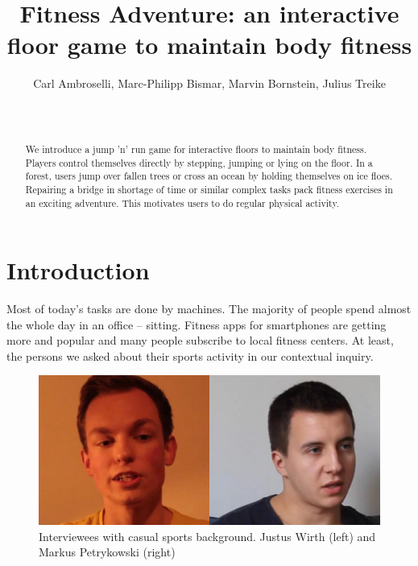 \documentclass{sigchi}
\begin{document}
  \title{Fitness Adventure: an interactive floor game to maintain body fitness}

  \author{
    \alignauthor Carl Ambroselli, Marc-Philipp Bismar, Marvin Bornstein, Julius Treike\\
    \\
    \\
  }

  \maketitle

  \begin{abstract}
    We introduce a jump 'n' run game for interactive floors to maintain body fitness. Players control themselves directly by stepping, jumping or lying on the floor. In a forest, users jump over fallen trees or cross an ocean by holding themselves on ice floes. Repairing a bridge in shortage of time or similar complex tasks pack fitness exercises in an exciting adventure. This motivates users to do regular physical activity.
  \end{abstract}

  \section{Introduction}
    Most of today's tasks are done by machines. The majority of people spend almost the whole day in an office -- sitting.
    Fitness apps for smartphones are getting more and popular and many people subscribe to local fitness centers. 
    At least, the persons we asked about their sports activity in our contextual inquiry. 

    \begin{figure}[ht]
      \centering
      \includegraphics[width=\columnwidth]{users_casual}
      \caption{Interviewees with casual sports background. Justus Wirth (left) and Markus Petrykowski (right)}
      \label{fig:users_casual}
    \end{figure}
\end{document}
